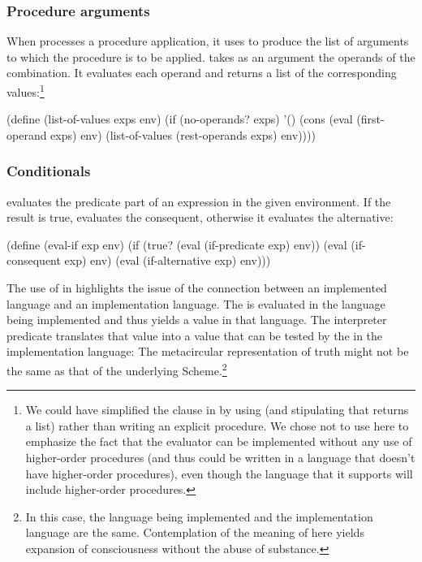 \subsubsection*{Procedure arguments}

When  processes a procedure application, it uses
 to produce the list of arguments to which the procedure
is to be applied.  takes as an argument the operands of
the combination.  It evaluates each operand and returns a list of the
corresponding values:\footnote{We could have simplified the 
clause in  by using  (and stipulating that 
returns a list) rather than writing an explicit 
procedure.  We chose not to use  here to emphasize the fact that the
evaluator can be implemented without any use of higher-order procedures (and
thus could be written in a language that doesn't have higher-order procedures),
even though the language that it supports will include higher-order
procedures.}

\begin{codeBlock}
(define (list-of-values exps env)
  (if (no-operands? exps)
      '()
      (cons (eval (first-operand exps) env)
            (list-of-values (rest-operands exps) env))))
\end{codeBlock}

\subsubsection*{Conditionals}

 evaluates the predicate part of an  expression in the
given environment.  If the result is true,  evaluates the
consequent, otherwise it evaluates the alternative:

\begin{codeBlock}
(define (eval-if exp env)
  (if (true? (eval (if-predicate exp) env))
      (eval (if-consequent exp) env)
      (eval (if-alternative exp) env)))
\end{codeBlock}

\noindent
The use of  in  highlights the issue of the
connection between an implemented language and an implementation language.  The
 is evaluated in the language being implemented and thus
yields a value in that language.  The interpreter predicate 
translates that value into a value that can be tested by the  in the
implementation language: The metacircular representation of truth might not be
the same as that of the underlying Scheme.\footnote{In this case, the language
being implemented and the implementation language are the same.  Contemplation
of the meaning of  here yields expansion of consciousness without
the abuse of substance.}

